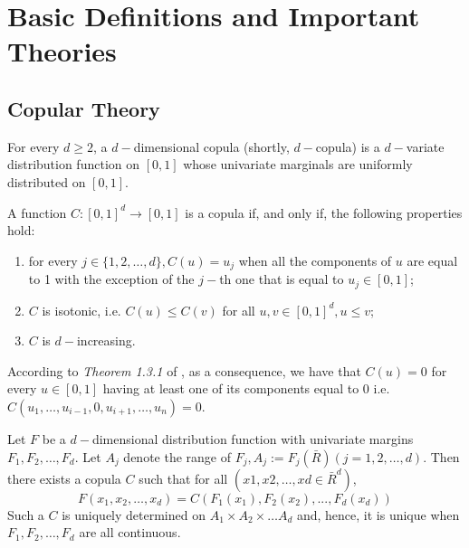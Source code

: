		\section{Basic Definitions and Important Theories}
			\subsection{Copular Theory}
				\begin{defn} \label{dfn:copula}\cite{jaworski2010copula}
					For every $d \ge 2$, a $d-$dimensional copula (shortly, $d-$copula) is a
					$d-$variate distribution function on $[0,1]$ whose univariate marginals are uniformly distributed on $[0,1]$.
				\end{defn}

				\begin{thm}
					A function $C: [0,1]^d \rightarrow [0,1]$  is a copula if, and only if, the following properties
					hold:
					\begin{enumerate}
						\item for every $j \in \{1,2, \dots ,d\}, C(u) = u_j$ when all the components of $u$ are
						equal to 1 with the exception of the $j-$th one that is equal to $u_j \in [0,1]$;
						\item $C$ is isotonic, i.e. $C(u) \le C(v)$ for all $u,v \in [0,1]^d, u \le v$;
						\item $C$ is $d-$increasing.
					\end{enumerate}
					According to \textit{Theorem 1.3.1} of \cite{jaworski2010copula}, as a consequence, we have that $C(u)=0$ for every $u \in [0,1]$ having at least one of its components equal to 0 i.e. $C(u_1,\dots,u_{i-1},0,u_{i+1},\dots,u_n)=0$.
				\end{thm}


				\begin{thm}
					\label{thm:sklar}
					Let $F$ be a $d-$dimensional distribution function with univariate margins $F_1, F_2,\dots, F_d$. Let $A_j$ denote the range of $F_j, A_j := F_j(\bar{R}) (j = 1,2, \dots,d)$. Then there exists a copula $C$ such that for all $(x1,x2, \dots,xd \in \bar{R}^d)$, \\
						\begin{equation}\label{eqn:sklar}
							F(x_1,x_2, \dots ,x_d) =C(F_1(x_1),F_2(x_2), . . . ,F_d(x_d))
						\end{equation}
					Such a $C$ is uniquely determined on $A_1\times A_2\times \dots A_d$ and, hence, it is unique when $F_1, F_2,\dots, F_d$ are all continuous.\cite{jaworski2010copula}
				\end{thm}

